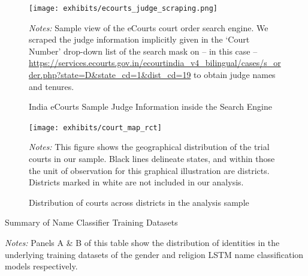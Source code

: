 \documentclass[12pt,english]{article}
\begin{document}
\begin{appendices}
\begin{figure}[htp!]
 \centering
 \caption{India eCourts Sample Judge Information inside the Search Engine}
 \texttt{[image: exhibits/ecourts\_judge\_scraping.png]}
 \label{fig:ecourts_judge_scraping}
 \begin{minipage}{1.0\textwidth}
    {\scriptsize \emph{Notes:} Sample view of the eCourts court order search engine. We scraped the judge information implicitly given in the `Court Number' drop-down list of the search mask on -- in this case -- \url{https://services.ecourts.gov.in/ecourtindia_v4_bilingual/cases/s_order.php?state=D&state_cd=1&dist_cd=19} to obtain judge names and tenures.\par}
 \end{minipage}
\end{figure}


\begin{figure}
    \centering
    \caption{Distribution of courts across districts in the analysis sample}
    \texttt{[image: exhibits/court\_map\_rct]} 
    \label{fig:court_maps}
     \begin{minipage}{1.0\textwidth}
    {\scriptsize \emph{Notes:} This figure shows the geographical distribution of the trial courts in our sample. Black lines delineate states, and within those the unit of observation for this graphical illustration are districts. Districts marked in white are not included in our analysis.\par}
 \end{minipage}
\end{figure}

\newpage

\begin{table}
  \begin{center}
  \caption{Summary of Name Classifier Training Datasets}
  \label{tab:training}
  
  \end{center}
   \begin{minipage}{1.0\textwidth}
    {\scriptsize \emph{Notes:} Panels A \& B of this table show the distribution of identities in the underlying training datasets of the gender and religion LSTM name classification models respectively.\par}
 \end{minipage}
\end{table}


\end{appendices}
\end{document}
